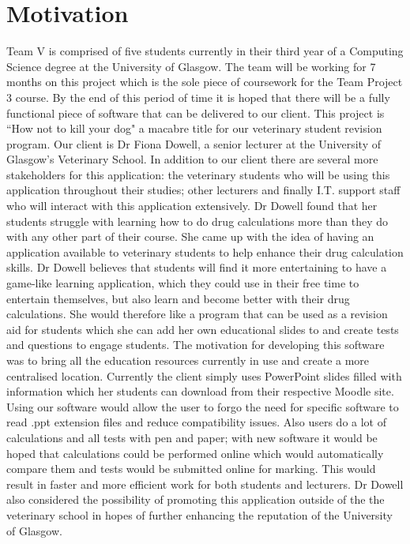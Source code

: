 \documentclass{l3proj}
\begin{document}
\section{Motivation}
Team V is comprised of five students currently in their third year of a Computing Science degree at the University of Glasgow. The team will be working for 7 months on this project which is the sole piece of coursework for the Team Project 3 course. By the end of this period of time it is hoped that there will be a fully functional piece of software that can be delivered to our client.
\newline
\newline
This project is ``How not to kill your dog" a macabre title for our veterinary student revision program. Our client is Dr Fiona Dowell, a senior lecturer at the University of Glasgow's Veterinary School. In addition to our client there are several more stakeholders for this application: the veterinary students who will be using this application throughout their studies; other lecturers and finally I.T. support staff who will interact with this application extensively.  Dr Dowell found that her students struggle with learning how to do drug calculations more than they do with any other part of their course. She came up with the idea of having an application available to veterinary students to help enhance their drug calculation skills.
\newline
\newline
Dr Dowell believes that students will find it more entertaining to have a game-like learning application, which they could use in their free time to entertain themselves, but also learn and become better with their drug calculations. She would therefore like a program that can be used as a revision aid for students which she can add her own educational slides to and create tests and questions to engage students.
\newline
\newline
The motivation for developing this software was to bring all the education resources currently in use and create a more centralised location. Currently the client simply uses PowerPoint slides filled with information which her students can download from their respective Moodle site. Using our software would allow the user to forgo the need for speciﬁc software to read .ppt extension files and reduce compatibility issues. Also users do a lot of calculations and all tests with pen and paper; with new software it would be hoped that calculations could be performed online which would automatically compare them and tests would be submitted online for marking. This would result in faster and more efficient work for both students and lecturers. Dr Dowell also considered the possibility of promoting this application outside of the the veterinary school in hopes of further enhancing the reputation of the University of Glasgow.
\end{document}
